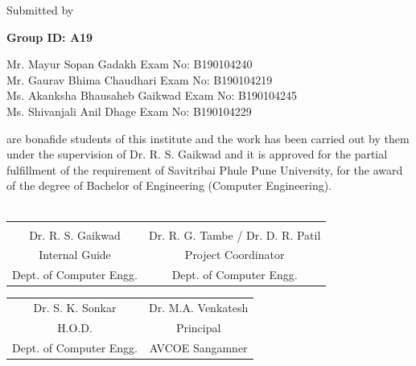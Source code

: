 \documentclass[oneside,a4paper,12pt]{report}
\begin{document}
\centerline{Submitted by}
\vspace*{1mm}
\centerline{\bf{Group ID: A19}}  
\begin{flushleft}
\hspace{15mm}Mr. Mayur Sopan Gadakh   \hspace{31 mm} Exam No: B190104240  \\
\hspace{15mm}Mr. Gaurav Bhima Chaudhari  \hspace{25 mm} Exam No: B190104219   \\
\hspace{15mm}Ms. Akanksha Bhausaheb Gaikwad  \hspace{15 mm} Exam No:  B190104245  \\
\hspace{15mm}Ms. Shivanjali Anil Dhage \hspace{30 mm} Exam No: B190104229\\
\end{flushleft}
\vspace*{1mm} 
are bonafide students of this institute and the work has been carried out by them under the supervision of  Dr. R. S. Gaikwad and it is approved for the partial fulfillment of the requirement of Savitribai Phule Pune University, for the award of the degree of Bachelor of Engineering (Computer Engineering). \\\\
\bgroup
\def\arraystretch{0.7}
\begin{tabular}{c c }
\\
\\
Dr. R. S. Gaikwad &  \hspace{40 mm} Dr. R. G. Tambe / Dr. D. R. Patil \\								
Internal Guide   &  \hspace{40 mm} Project Coordinator \\
Dept. of Computer Engg.  &	\hspace{40 mm}Dept. of Computer Engg.  \\
\end{tabular}
 \vspace*{1.5\baselineskip}                     
                                                   
\begin{tabular}{c c }
\\
Dr. S. K. Sonkar &  \hspace{50 mm} Dr. M.A. Venkatesh \\								
H.O.D.   &  \hspace{50 mm} Principal \\
Dept. of Computer Engg.  &	\hspace{50 mm}AVCOE Sangamner  \\
\end{tabular}
\end{document}
